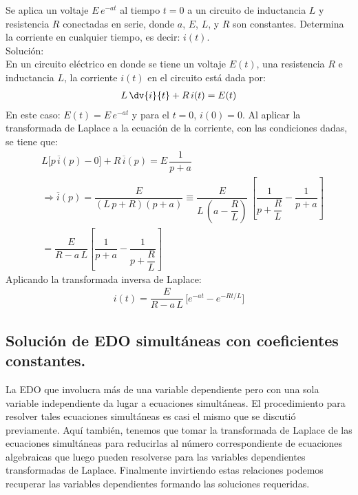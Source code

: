 \begin{ejemplo}
Se aplica un voltaje $E \, e^{- a t}$ al tiempo $t = 0$ a un circuito de inductancia $L$ y resistencia $R$ conectadas en serie, donde $a$, $E$, $L$, y $R$ son constantes. Determina la corriente en cualquier tiempo, es decir: $i(t)$.
\\[0.5em]
\noindent
Solución:
\\
En un circuito eléctrico en donde se tiene un voltaje $E(t)$, una resistencia $R$ e inductancia $L$, la corriente $i(t)$ en el circuito está dada por:
\begin{align*}
L \, \dv{i}{t} + R \, i(t) =  E(t)
\end{align*}
En este caso: $E(t) = E \, e^{-a t}$ y para el $t = 0$, $i(0) = 0$. Al aplicar la transformada de Laplace a la ecuación de la corriente, con las condiciones dadas, se tiene que:
\begin{align*}
&L \big[  p \, \overline{i}(p) - 0  \big] + R \, \overline{i} (p) = E \, \dfrac{1}{p + a} \\[0.5em]
&\Rightarrow \overline{i}(p) = \dfrac{E}{(L \, p + R)(p + a)} \equiv \dfrac{E}{L \, \left(a - \dfrac{R}{L} \right)} \, \left[ \dfrac{1}{p + \dfrac{R}{L}}  - \dfrac{1}{p + a}\right] \\[0.5em]
&= \dfrac{E}{R - a \, L} \left[ \dfrac{1}{p + a} - \dfrac{1}{p + \dfrac{R}{L}}\right]
\end{align*}
Aplicando la transformada inversa de Laplace:
\begin{align*}
i(t) = \dfrac{E}{R - a \, L} \, \big[  e^{-a t} - e^{-R t /L} \big]
\end{align*}
\end{ejemplo}

\subsection{Solución de EDO simultáneas con coeficientes constantes.}

La EDO que involucra más de una variable dependiente pero con una sola variable independiente da lugar a ecuaciones simultáneas. El procedimiento para resolver tales ecuaciones simultáneas es casi el mismo que se discutió previamente. Aquí también, tenemos que tomar la transformada de Laplace de las ecuaciones simultáneas para reducirlas al número correspondiente de ecuaciones algebraicas que luego pueden resolverse para las variables dependientes transformadas de Laplace. Finalmente invirtiendo estas relaciones podemos recuperar las variables dependientes formando las soluciones requeridas.

